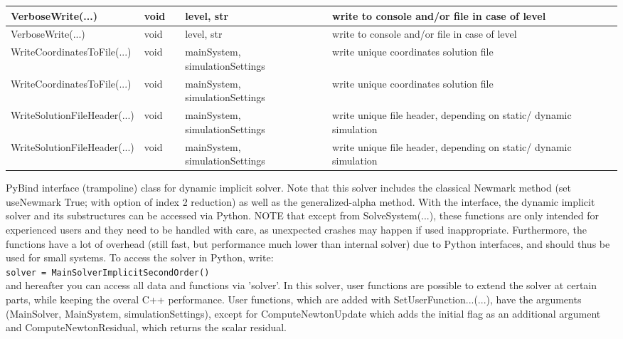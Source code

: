 \begin{center}
\begin{longtable}{| p{4.2cm} | p{2.5cm} | p{0.3cm} | p{3.0cm} | p{6cm} |}
    VerboseWrite(...) &     void &      &     level, str &     write to console and/or file in case of level\\ \hline
    VerboseWrite(...) &     void &      &     level, str &     write to console and/or file in case of level\\ \hline
    WriteCoordinatesToFile(...) &     void &      &     mainSystem, simulationSettings &     write unique coordinates solution file\\ \hline
    WriteCoordinatesToFile(...) &     void &      &     mainSystem, simulationSettings &     write unique coordinates solution file\\ \hline
    WriteSolutionFileHeader(...) &     void &      &     mainSystem, simulationSettings &     write unique file header, depending on static/ dynamic simulation\\ \hline
    WriteSolutionFileHeader(...) &     void &      &     mainSystem, simulationSettings &     write unique file header, depending on static/ dynamic simulation\\ \hline
	  \end{longtable}
	\end{center}



\label{sec:MainSolverImplicitSecondOrder}
PyBind interface (trampoline) class for dynamic implicit solver. Note that this solver includes the classical Newmark method (set useNewmark True; with option of index 2 reduction) as well as the generalized-alpha method. With the interface, the dynamic implicit solver and its substructures can be accessed via Python. NOTE that except from SolveSystem(...), these functions are only intended for experienced users and they need to be handled with care, as unexpected crashes may happen if used inappropriate. Furthermore, the functions have a lot of overhead (still fast, but performance much lower than internal solver) due to Python interfaces, and should thus be used for small systems. To access the solver in Python, write: \\ 
 \texttt{solver = MainSolverImplicitSecondOrder()} \\ 
and hereafter you can access all data and functions via 'solver'.
 In this solver, user functions are possible to extend the solver at certain parts, while keeping the overal C++ performance. User functions, which are added with SetUserFunction...(...), have the arguments (MainSolver, MainSystem, simulationSettings), except for ComputeNewtonUpdate which adds the initial flag as an additional argument and ComputeNewtonResidual, which returns the scalar residual.

